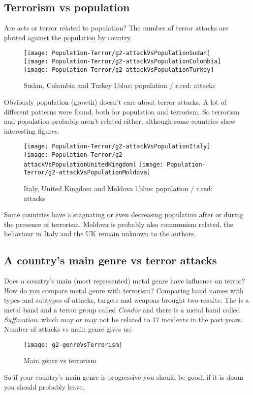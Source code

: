\subsection{Terrorism vs population}
Are acts or terror related to population? The number of terror attacks are plotted against the population by country.
\begin{figure}[hbt!]
	\texttt{[image: Population-Terror/g2-attackVsPopulationSudan]}
	\centering
	\texttt{[image: Population-Terror/g2-attackVsPopulationColombia]}
	\texttt{[image: Population-Terror/g2-attackVsPopulationTurkey]}
	\caption{Sudan, Colombia and Turkey l,blue: population / r,red: attacks}
\end{figure}
Obviously population (growth) doesn't care about terror attacks. A lot of different patterns were found, both for population and terrorism. So terrorism and population probably aren't related either, although some countries show interesting figures.
\begin{figure}[hbt!]
	\texttt{[image: Population-Terror/g2-attackVsPopulationItaly]}
	\centering
	\texttt{[image: Population-Terror/g2-attackVsPopulationUnitedKingdom]}
	\texttt{[image: Population-Terror/g2-attackVsPopulationMoldova]}
	\caption{Italy, United Kingdom and Moldova l,blue: population / r,red: attacks}
\end{figure}
Some countries have a stagnating or even decreasing population after or during the presence of terrorism. Moldova is probably also communism related, the behaviour in Italy and the UK remain unknown to the authors.


\subsection{A country's main genre vs terror attacks}
Does a country's main (most represented) metal genre have influence on terror?
How do you compare metal genre with terrorism? Comparing band names with types and subtypes of attacks, targets and weapons brought two results: The is a metal band and a terror group called \emph{Condor} and there is a metal band called \emph{Suffocation}, which may or may not be related to 17 incidents in the past years. Number of attacks vs main genre gives us:
\begin{figure}[hbt!]
	\centering
	\texttt{[image: g2-genreVsTerrorism]}
	\caption{Main genre vs terrorism}
\end{figure}
So if your country's main genre is progressive you should be good, if it is doom you should probably leave.


